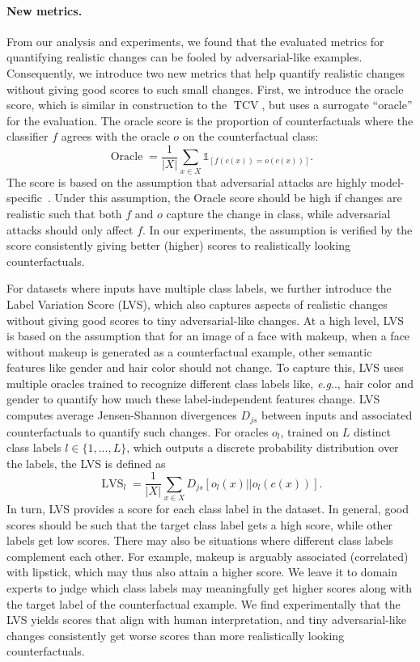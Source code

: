 \documentclass[11pt,a4paper,twoside,openright,final]{memoir}
\makeatletter
\DeclareRobustCommand\onedot{\futurelet\@let@token\@onedot}
\def\@onedot{\ifx\@let@token.\else.\null\fi\xspace}
\def\eg{\emph{e.g}\onedot} \def\Eg{\emph{E.g}\onedot}
\makeatother
\begin{document}
\paragraph{New metrics.}
From our analysis and experiments, we found that the evaluated metrics for quantifying realistic changes can be fooled by adversarial-like examples.
Consequently, we introduce two new metrics that help quantify realistic changes without giving good scores to such small changes.
First, we introduce the oracle score, which is similar in construction to the $\operatorname{TCV}$, but uses a surrogate ``oracle'' for the evaluation.
The oracle score is the proportion of counterfactuals where the classifier $f$ agrees with the oracle $o$ on the counterfactual class: 
\begin{equation}\label{eq:oracle}
    \operatorname{Oracle} = \frac{1}{|X|}\sum_{x\in X} \mathbb{1}_{[ f(c(x)) = o(c(x)) ]}.
\end{equation}
The score is based on the assumption that adversarial attacks are highly model-specific~\cite{Liu2017}.
Under this assumption, the Oracle score should be high if changes are realistic such that both $f$ and $o$ capture the change in class, while adversarial attacks should only affect $f$.
In our experiments, the assumption is verified by the score consistently giving better (higher) scores to realistically looking counterfactuals.

For datasets where inputs have multiple class labels, we further introduce the Label Variation Score (LVS), which also captures aspects of realistic changes without giving good scores to tiny adversarial-like changes.
At a high level, LVS is based on the assumption that for an image of a face with makeup, when a face without makeup is generated as a counterfactual example, other semantic features like gender and hair color should not change.
To capture this, LVS uses multiple oracles trained to recognize different class labels like, \eg, hair color and gender to quantify how much these label-independent features change. 
LVS computes average Jensen-Shannon divergences $D_{js}$ between inputs and associated counterfactuals to quantify such changes.
For oracles $o_l$, trained on $L$ distinct class labels $l\in \{1,...,L\}$, which outputs a discrete probability distribution over the labels, the LVS is defined as 
\begin{equation}\label{eq:lvs}
   \operatorname{LVS}_l = \frac{1}{|X|} \sum_{x \in X} D_{js}\left[ o_l(x) || o_l(c(x))\right].
\end{equation}
In turn, LVS provides a score for each class label in the dataset.
In general, good scores should be such that the target class label gets a high score, while other labels get low scores.
There may also be situations where different class labels complement each other. 
For example, makeup is arguably associated (correlated) with lipstick, which may thus also attain a higher score.
We leave it to domain experts to judge which class labels may meaningfully get higher scores along with the target label of the counterfactual example. 
We find experimentally that the LVS yields scores that align with human interpretation, and tiny adversarial-like changes consistently get worse scores than more realistically looking counterfactuals.
\end{document}
